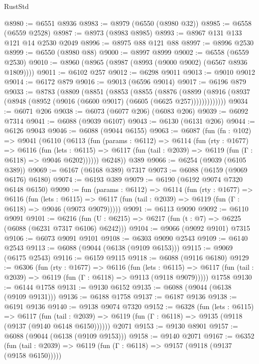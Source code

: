 \begin{lexlean}{RustStd}
\begin{coremodule}
@8980 := @6551 @8936
@8983 := @8979 (@6550 (@8980 @32))
@8985 := @6558 (@6559 @2528)
@8987 := @8973 (@8983 @8985)
@8993 := @8967 @131 @133 @121 @14 @2530 @2049
@8996 := @8975 @88 @121 @88
@8997 := @8996 @2530
@8999 := @6550 (@8980 @88)
@9000 := @8997 @8999
@9002 := @6558 (@6559 @2530)
@9010 := @8960 (@8965 (@8987 (@8993 (@9000 @9002) (@6567 @8936 @1809))))
@9011 := @6102 @257
@9012 := @6298 @9011
@9013 := @9010 @9012
@9014 := @6172 @879
@9016 := @9013 (@6596 @9014)
@9017 := @6196 @879
@9033 := @8783
    (@8809
      (@8851
        (@8853
          (@8855
            (@8876
              (@8899
                (@8916 (@8937 (@8948 (@8952 (@9016 (@6600 @9017) (@6605 (@6625 @257)))))))))))))
@9034 := @6071 @206
@9038 := @6073 (@6077 @206) (@6083 @206)
@9039 := @6092 @7314
@9041 := @6088 (@9039 @6107)
@9043 := @6130 (@6131 @206)
@9044 := @6126 @9043
@9046 := @6088 (@9044 @6155)
@9063 := @6087
    (fun (fn : @102) =>
    @9041
      (@6110
        (@6113
          (fun (params : @6112) =>
          @6114
            (fun (rty : @1677) =>
            @6116
              (fun (lets : @6115) =>
              @6117 (fun (tail : @2039) => @6119 (fun (Γ : @6118) => @9046 @6202))))))
        @6248))
    @389
@9066 := @6254 (@9039 (@6105 @389))
@9069 := @6167 (@6168 @389) @7317
@9073 := @6088 (@6159 (@9069 @6176) @6180)
@9074 := @6193 @389
@9079 := @6190 (@6192 @9074 @7320 @6148 @6150)
@9090 := fun (params : @6112) =>
  @6114
    (fun (rty : @1677) =>
    @6116
      (fun (lets : @6115) =>
      @6117 (fun (tail : @2039) => @6119 (fun (Γ : @6118) => @9046 (@9073 @9079)))))
@9091 := @6113 @9090
@9092 := @6110 @9091
@9101 := @6216 (fun (U : @6215) => @6217 (fun (t : @7) => @6225 (@6088 (@6231 @7317 @6106) @6242)))
@9104 := @9066 (@9092 @9101) @7315
@9106 := @6073 @9091 @9101
@9108 := @6303 @9090 @2543
@9109 := @6140 @2543
@9113 := @6088 (@9044 (@6138 (@9109 @6153)))
@9115 := @9069 (@6175 @2543)
@9116 := @6159 @9115
@9118 := @6088 (@9116 @6180)
@9129 := @6306
    (fun (rty : @1677) =>
    @6116
      (fun (lets : @6115) =>
      @6117 (fun (tail : @2039) => @6119 (fun (Γ : @6118) => @9113 (@9118 @9079)))))
    @1758
@9130 := @6144 @1758
@9131 := @9130 @6152
@9135 := @6088 (@9044 (@6138 (@9109 @9131)))
@9136 := @6188 @1758
@9137 := @6187 @9136
@9138 := @6191 @9136
@9140 := @9138 @9074 @7320
@9152 := @6328
    (fun (lets : @6115) =>
    @6117
      (fun (tail : @2039) => @6119 (fun (Γ : @6118) => @9135 (@9118 (@9137 (@9140 @6148 @6150))))))
    @2071
@9153 := @9130 @8901
@9157 := @6088 (@9044 (@6138 (@9109 @9153)))
@9158 := @9140 @2071
@9167 := @6352
    (fun (tail : @2039) => @6119 (fun (Γ : @6118) => @9157 (@9118 (@9137 (@9158 @6150)))))

\end{coremodule}
\end{lexlean}
